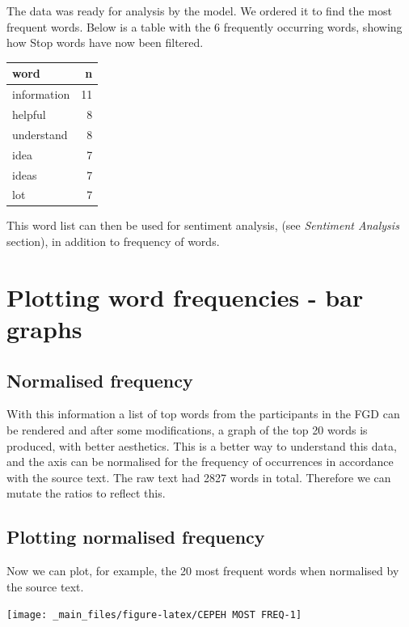 \documentclass[a4paper, nobind]{templates/ociamthesis}
\begin{document}
The data was ready for analysis by the model. We ordered it to find the
most frequent words. Below is a table with the 6 frequently occurring
words, showing how Stop words have now been filtered.

\begin{longtable}[]{@{}lr@{}}
\toprule()
word & n \\
\midrule()
\endhead
information & 11 \\
helpful & 8 \\
understand & 8 \\
idea & 7 \\
ideas & 7 \\
lot & 7 \\
\bottomrule()
\end{longtable}

This word list can then be used for sentiment analysis, (see \emph{Sentiment
Analysis} section), in addition to frequency of words.

\hypertarget{plotting-word-frequencies---bar-graphs}{%
\section{Plotting word frequencies - bar graphs}\label{plotting-word-frequencies---bar-graphs}}

\hypertarget{normalised-frequency}{%
\subsection{Normalised frequency}\label{normalised-frequency}}

With this information a list of top words from the participants in the
FGD can be rendered and after some modifications, a graph of the top 20
words is produced, with better aesthetics. This is a better way to
understand this data, and the axis can be normalised for the frequency
of occurrences in accordance with the source text. The raw text had 2827
words in total. Therefore we can mutate the ratios to reflect this.

\hypertarget{plotting-normalised-frequency}{%
\subsection{Plotting normalised frequency}\label{plotting-normalised-frequency}}

Now we can plot, for example, the 20 most frequent words when normalised
by the source text.

\begin{center}\texttt{[image: \_main\_files/figure-latex/CEPEH MOST FREQ-1]} \end{center}
\end{document}
